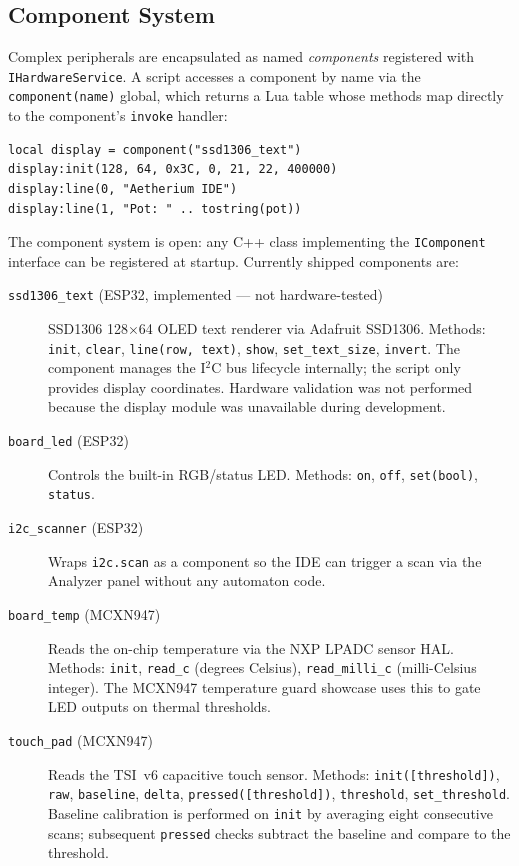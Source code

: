 \subsection{Component System}

Complex peripherals are encapsulated as named \textit{components} registered with \texttt{IHardwareService}. A script accesses a component by name via the \texttt{component(name)} global, which returns a Lua table whose methods map directly to the component's \texttt{invoke} handler:

\begin{lstlisting}[language={}]
local display = component("ssd1306_text")
display:init(128, 64, 0x3C, 0, 21, 22, 400000)
display:line(0, "Aetherium IDE")
display:line(1, "Pot: " .. tostring(pot))
\end{lstlisting}

The component system is open: any C++ class implementing the \texttt{IComponent} interface can be registered at startup. Currently shipped components are:

\begin{description}
  \item[\texttt{ssd1306\_text} (ESP32, implemented --- not hardware-tested)] SSD1306 128$\times$64 OLED text renderer via Adafruit SSD1306. Methods: \texttt{init}, \texttt{clear}, \texttt{line(row, text)}, \texttt{show}, \texttt{set\_text\_size}, \texttt{invert}. The component manages the I$^2$C bus lifecycle internally; the script only provides display coordinates. Hardware validation was not performed because the display module was unavailable during development.
  \item[\texttt{board\_led} (ESP32)] Controls the built-in RGB/status LED. Methods: \texttt{on}, \texttt{off}, \texttt{set(bool)}, \texttt{status}.
  \item[\texttt{i2c\_scanner} (ESP32)] Wraps \texttt{i2c.scan} as a component so the IDE can trigger a scan via the Analyzer panel without any automaton code.
  \item[\texttt{board\_temp} (MCXN947)] Reads the on-chip temperature via the NXP LPADC sensor HAL. Methods: \texttt{init}, \texttt{read\_c} (degrees Celsius), \texttt{read\_milli\_c} (milli-Celsius integer). The MCXN947 temperature guard showcase uses this to gate LED outputs on thermal thresholds.
  \item[\texttt{touch\_pad} (MCXN947)] Reads the TSI~v6 capacitive touch sensor. Methods: \texttt{init([threshold])}, \texttt{raw}, \texttt{baseline}, \texttt{delta}, \texttt{pressed([threshold])}, \texttt{threshold}, \texttt{set\_threshold}. Baseline calibration is performed on \texttt{init} by averaging eight consecutive scans; subsequent \texttt{pressed} checks subtract the baseline and compare to the threshold.
\end{description}

